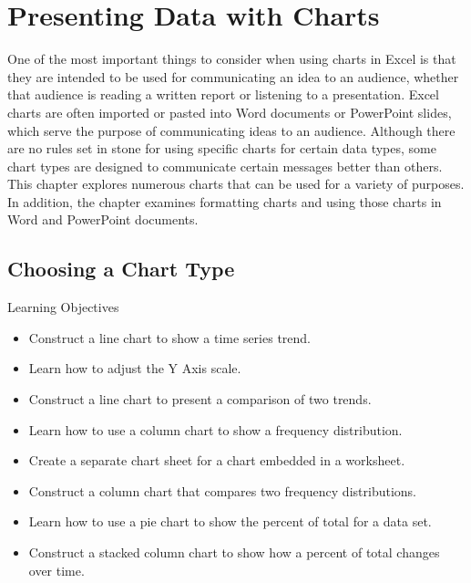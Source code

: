 \chapter{Presenting Data with Charts}\label{ch04:charts}

One of the most important things to consider when using charts in Excel is that they are intended to be used for communicating an idea to an audience, whether that audience is reading a written report or listening to a presentation. Excel charts are often imported or pasted into Word documents or PowerPoint slides, which serve the purpose of communicating ideas to an audience. Although there are no rules set in stone for using specific charts for certain data types, some chart types are designed to communicate certain messages better than others. This chapter explores numerous charts that can be used for a variety of purposes. In addition, the chapter examines formatting charts and using those charts in Word and PowerPoint documents.

\section{Choosing a Chart Type}

\begin{center}
	\begin{objbox}{Learning Objectives}
		\begin{itemize}
			\setlength{\itemsep}{0pt}
			\setlength{\parskip}{0pt}
			\setlength{\parsep}{0pt}

			\item Construct a line chart to show a time series trend.
			\item Learn how to adjust the Y Axis scale.
			\item Construct a line chart to present a comparison of two trends.
			\item Learn how to use a column chart to show a frequency distribution.
			\item Create a separate chart sheet for a chart embedded in a worksheet.
			\item Construct a column chart that compares two frequency distributions.
			\item Learn how to use a pie chart to show the percent of total for a data set.
			\item Construct a stacked column chart to show how a percent of total changes over time.
			
		\end{itemize}
	\end{objbox}
\end{center}

